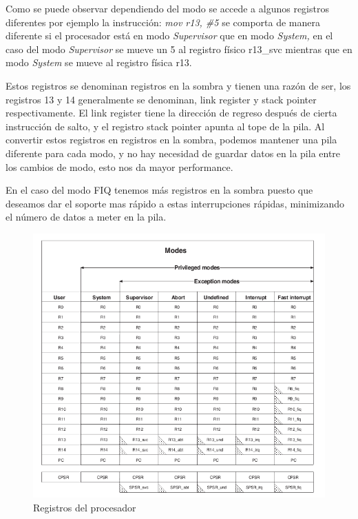 Como se puede observar dependiendo del modo se accede a algunos registros
diferentes por ejemplo la instrucción: \emph{mov r13, \#5 }se comporta
de manera diferente si el procesador está en modo \emph{Supervisor}
que en modo \emph{System, }en el caso del modo \emph{Supervisor} se
mueve un 5 al registro físico r13\_svc mientras que en modo \emph{System}
se mueve al registro física r13.

Estos registros se denominan registros en la sombra y tienen una razón
de ser, los registros 13 y 14 generalmente se denominan, link register
y stack pointer respectivamente. El link register tiene la dirección
de regreso después de cierta instrucción de salto, y el registro stack
pointer apunta al tope de la pila. Al convertir estos registros en
registros en la sombra, podemos mantener una pila diferente para cada
modo, y no hay necesidad de guardar datos en la pila entre los cambios
de modo, esto nos da mayor performance.

En el caso del modo \ac{FIQ} tenemos más registros en la sombra puesto
que deseamos dar el soporte mas rápido a estas interrupciones rápidas,
minimizando el número de datos a meter en la pila.

%
\begin{figure}
\includegraphics[scale=0.5]{img/registros}

\caption{\label{fig:registros}Registros del procesador}



\end{figure}



